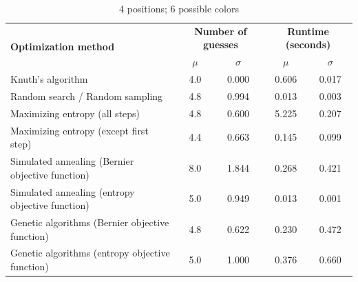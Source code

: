 \documentclass[11pt]{article}
\begin{document}
\begin{table}[h!]
\begin{center}
\begin{tabular}{l c c c c}
\toprule
\multirow{2}{*}{\bfseries Optimization method} 		& \multicolumn{2}{c}{\bfseries Number of guesses} 		& \multicolumn{2}{c}{\bfseries Runtime (seconds)}	\\
\cmidrule(lr){2-3}  \cmidrule(lr){4-5}				& $\mu$ & $\sigma$								& $\mu$ & $\sigma$							\\
\cmidrule(lr){1-5}
Knuth's algorithm							& 4.0 & 0.000									& 0.606 & 0.017							\\
Random search / Random sampling				& 4.8 & 0.994									& 0.013 & 0.003							\\
Maximizing entropy (all steps)					& 4.8 & 0.600									& 5.225 & 0.207							\\
Maximizing entropy (except first step)			& 4.4 & 0.663									& 0.145 & 0.099							\\
Simulated annealing (Bernier objective function)	& 8.0 & 1.844									& 0.268 & 0.421							\\
Simulated annealing (entropy objective function)	& 5.0 & 0.949									& 0.013 & 0.001							\\
Genetic algorithms (Bernier objective function)		& 4.8 & 0.622									& 0.230 & 0.472							\\
Genetic algorithms (entropy objective function)		& 5.0 & 1.000									& 0.376 & 0.660 							\\
\bottomrule
\end{tabular}
\end{center}
\caption{4 positions; 6 possible colors}
\label{fig:compare_4_6}
\end{table}
\end{document}
